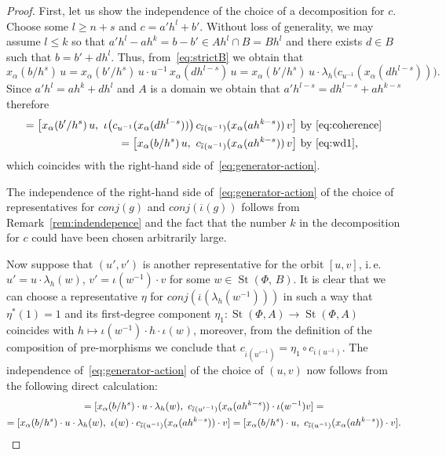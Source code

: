 \documentclass[oneside, 11pt]{amsart} \pdfoutput=1
\newcommand{\St}{\mathop{\mathrm{St}}\nolimits}
\numberwithin{equation}{section}
\theoremstyle{definition}
\begin{document}
\begin{proof}
First, let us show the independence of the choice of a decomposition for $c$. 
Choose some $l \geq n + s$ and $c = a' h^{l} + b'$. Without loss of generality, we may assume $l \leq k$ so that $a' h^{l} - a h^k = b - b' \in Ah^{l} \cap B = Bh^{l}$ and there exists $d \in B$ such that $b = b' + dh^{l}$. Thus, from~\eqref{eq:strictB} we obtain that
\begin{equation} \label{eq:wd1} \textstyle x_\alpha(b/{h^s})\, u = x_\alpha({b'}/{h^s})\, u \cdot u^{-1}\, x_\alpha(dh^{l-s})\, u =  x_\alpha({b'}/{h^s})\, u \cdot \lambda_h \bigl(c_{u^{-1}}(x_\alpha(dh^{l-s}))\bigr). \end{equation}
Since $a'h^l = ah^k + dh^l$ and $A$ is a domain we obtain that $a'h^{l-s} = dh^{l-s} + ah^{k-s}$ therefore
\begin{align*}
[x_\alpha(b'/{h^s})\, u,\ c_{\overline{\iota}(u^{-1})}(x_\alpha(a'h^{l - s}))\, v\bigr] = \bigl[x_\alpha(b'/{h^s})\, u,\ \iota\bigl(c_{u^{-1}}(x_\alpha(dh^{l-s}))\bigr)\, c_{\overline{\iota}(u^{-1})}(x_\alpha(ah^{k - s}))\, v\bigr] & \text{ by~\eqref{eq:coherence}} \\ = \bigl[x_\alpha(b/{h^s})\, u,\ c_{\overline{\iota}(u^{-1})}(x_\alpha(ah^{k - s}))\, v\bigr] &\text{ by~\eqref{eq:wd1},}
\end{align*}
 which coincides with the right-hand side of~\eqref{eq:generator-action}.

The independence of the right-hand side of~\eqref{eq:generator-action} of the choice of representatives for $conj(g)$ and $conj(\overline{\iota}(g))$ follows from Remark~\ref{rem:indendepence} and the fact that the number $k$ in the decomposition for $c$ could have been chosen arbitrarily large.

Now suppose that $(u', v')$ is another representative for the orbit $[u, v]$, i.\,e. $u' = u \cdot \lambda_h(w)$, $v' = \iota(w^{-1})\cdot v$ for some $w \in \St(\Phi,\,B)$. It is clear that we can choose a representative $\eta$ for $conj(\overline{\iota}(\lambda_h(w^{-1})))$ in such a way that $\eta^*(1)=1$ and its first-degree component $\eta_1 \colon \St(\Phi, A) \to \St(\Phi, A)$ coincides with $h \mapsto \iota(w^{-1}) \cdot h \cdot \iota(w)$, moreover, from the definition of the composition of pre-morphisms we conclude that $c_{\overline{\iota}({u'}^{-1})} =  \eta_1 \circ c_{\overline{\iota}(u^{-1})} $. The independence of~\eqref{eq:generator-action} of the choice of $(u, v)$ now follows from the following direct calculation:
\begin{multline*}
 [x_\alpha(b/h^s) \cdot u',\ c_{\overline{\iota}({u'}^{-1})}(x_\alpha(ah^{k-s}))\cdot v'] = [x_\alpha(b/h^s) \cdot u \cdot \lambda_h(w),\ c_{\overline{\iota}({u'}^{-1})}(x_\alpha(ah^{k-s}))\cdot \iota(w^{-1}) v] = \\
 = [x_\alpha(b/h^s) \cdot u \cdot \lambda_h(w),\ \iota(w) \cdot c_{\overline{\iota}(u^{-1})}(x_\alpha(ah^{k-s}))\cdot v] 
 = [x_\alpha(b/h^s) \cdot u,\ c_{\overline{\iota}(u^{-1})}(x_\alpha(ah^{k-s}))\cdot v]. \qedhere
\end{multline*}
\end{proof}
\end{document}
